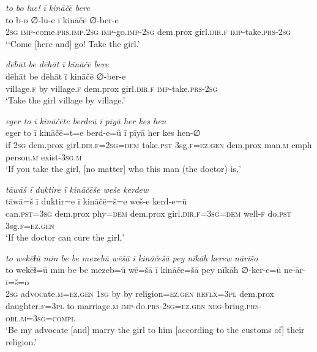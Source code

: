 \ea \label{ŽP.159}
\textit{to bo lue! ī kināčē bere} \\ 
\gll to b-o ∅-lu-e ī kināčē ∅-ber-e \\ 
 \textsc{2sg} \textsc{imp-}come\textsc{.prs}\textsc{.imp}\textsc{.\textsc{2sg}} \textsc{imp-}go.\textsc{imp-}\textsc{2sg} dem.prox girl\textsc{.dir}\textsc{.f} \textsc{imp-}take\textsc{.prs}-\textsc{2sg} \\ 
\glt `‘Come [here and] go! Take the girl.'
\z 
 
\ea \label{ŽP.162}
\textit{dēhāt be dēhāt ī kināčē bere} \\ 
\gll dēhāt be dēhāt ī kināčē ∅-ber-e \\ 
 village\textsc{.f} by village\textsc{.f} dem.prox girl\textsc{.dir}\textsc{.f} \textsc{imp-}take\textsc{.prs}-\textsc{2sg} \\ 
\glt `Take the girl village by village.'
\z 
 
\ea \label{ŽP.163}
\textit{eger to ī kināčēte berdeū ī pīyā her kes hen} \\ 
\gll eger to ī kināčē=t=e berd-e=ū ī pīyā her kes hen-∅ \\ 
 if \textsc{2sg} dem.prox girl\textsc{.dir}\textsc{.f}\textsc{=\textsc{2sg}}\textsc{=dem} take\textsc{.pst} 3sg\textsc{.f}\textsc{\textsc{=ez.gen}} dem.prox man\textsc{.m} emph person\textsc{.m} exist\textsc{-3sg}\textsc{.m} \\ 
\glt `If you take the girl, [no matter] who this man (the doctor) is,'
\z 
 
\ea \label{ŽP.164}
\textit{tāwāš ī duktire ī kināčēše weše kerdew} \\ 
\gll tāwā=š ī duktir=e ī kināčē=š=e weš-e kerd-e=ū \\ 
 can\textsc{.pst}\textsc{=3sg} dem.prox phy\textsc{=dem} dem.prox girl\textsc{.dir}\textsc{.f}\textsc{=3sg}\textsc{=dem} well\textsc{-f} do\textsc{.pst} 3sg\textsc{.f}\textsc{\textsc{=ez.gen}} \\ 
\glt `If the doctor can cure the girl,'
\z 
 
\ea \label{ŽP.165}
\textit{to wekēɫū min be be mezebū wēšā ī kināčešā pey nīkāh kerew nārīšo} \\ 
\gll to wekēɫ=ū min be be mezeb=ū wē=šā ī kināče=šā pey nīkāh ∅-ker-e=ū ne-ār-ī=š=o \\ 
 \textsc{2sg} ad\textsc{voc}ate\textsc{.m}\textsc{\textsc{=ez.gen}} \textsc{1sg} by by religion\textsc{\textsc{=ez.gen}} \textsc{reflx}\textsc{=3pl} dem.prox daughter\textsc{.f}\textsc{=3pl} to marriage\textsc{.m} \textsc{imp-}do\textsc{.prs}-\textsc{2sg}\textsc{\textsc{=ez.gen}} \textsc{neg-}bring\textsc{.prs}\textsc{-obl}\textsc{.m}\textsc{=3sg}\textsc{=compl} \\ 
\glt `Be my advocate [and] marry the girl to him [according to the customs of] their religion.'
\z 
 
